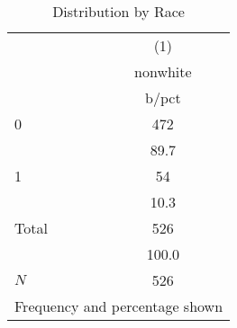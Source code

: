 \begin{table}[htbp]\centering
\def\sym#1{\ifmmode^{#1}\else\(^{#1}\)\fi}
\caption{Distribution by Race}\label{tab:0201-nonwhite_frequency}
\begin{tabular}{l*{1}{c}}
\toprule
            &\multicolumn{1}{c}{(1)}\\
            &\multicolumn{1}{c}{nonwhite}\\
            &       b/pct\\
\midrule
0           &         472\\
            &        89.7\\
1           &          54\\
            &        10.3\\
Total       &         526\\
            &       100.0\\
\midrule
\(N\)       &         526\\
\bottomrule
\multicolumn{2}{l}{\footnotesize Frequency and percentage shown}\\
\end{tabular}
\end{table}
